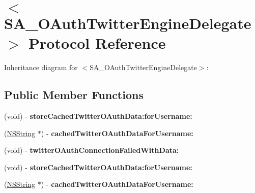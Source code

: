 \hypertarget{protocol_s_a___o_auth_twitter_engine_delegate-p}{
\section{$<$\-S\-A\-\_\-\-O\-Auth\-Twitter\-Engine\-Delegate$>$ \-Protocol \-Reference}
\label{protocol_s_a___o_auth_twitter_engine_delegate-p}
}


\-Inheritance diagram for $<$\-S\-A\-\_\-\-O\-Auth\-Twitter\-Engine\-Delegate$>$\-:
\subsection*{\-Public \-Member \-Functions}
\begin{DoxyCompactItemize}
\item 
\hypertarget{protocol_s_a___o_auth_twitter_engine_delegate-p_ad5334f98671ef61d2588767ed1d4e0b9}{
(void) -\/ {\bfseries store\-Cached\-Twitter\-O\-Auth\-Data\-:for\-Username\-:}}
\label{protocol_s_a___o_auth_twitter_engine_delegate-p_ad5334f98671ef61d2588767ed1d4e0b9}

\item 
\hypertarget{protocol_s_a___o_auth_twitter_engine_delegate-p_a9f0f5316b6bcd5630b6d4e0c4b9347fa}{
(\hyperlink{class_n_s_string}{\-N\-S\-String} $\ast$) -\/ {\bfseries cached\-Twitter\-O\-Auth\-Data\-For\-Username\-:}}
\label{protocol_s_a___o_auth_twitter_engine_delegate-p_a9f0f5316b6bcd5630b6d4e0c4b9347fa}

\item 
\hypertarget{protocol_s_a___o_auth_twitter_engine_delegate-p_abf2ca64b17b5440343167a3d6faa0542}{
(void) -\/ {\bfseries twitter\-O\-Auth\-Connection\-Failed\-With\-Data\-:}}
\label{protocol_s_a___o_auth_twitter_engine_delegate-p_abf2ca64b17b5440343167a3d6faa0542}

\item 
\hypertarget{protocol_s_a___o_auth_twitter_engine_delegate-p_ad5334f98671ef61d2588767ed1d4e0b9}{
(void) -\/ {\bfseries store\-Cached\-Twitter\-O\-Auth\-Data\-:for\-Username\-:}}
\label{protocol_s_a___o_auth_twitter_engine_delegate-p_ad5334f98671ef61d2588767ed1d4e0b9}

\item 
\hypertarget{protocol_s_a___o_auth_twitter_engine_delegate-p_a9f0f5316b6bcd5630b6d4e0c4b9347fa}{
(\hyperlink{class_n_s_string}{\-N\-S\-String} $\ast$) -\/ {\bfseries cached\-Twitter\-O\-Auth\-Data\-For\-Username\-:}}
\label{protocol_s_a___o_auth_twitter_engine_delegate-p_a9f0f5316b6bcd5630b6d4e0c4b9347fa}


\end{DoxyCompactItemize}
